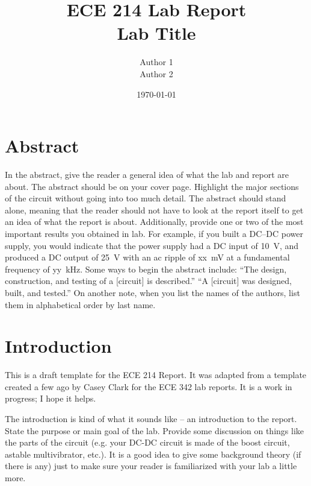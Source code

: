 \documentclass[11pt]{article}
\begin{document}
\title{ \textbf{ECE 214 Lab Report}\\
	Lab Title}
\author{Author 1\\
  	Author 2}
\date{\today}
\maketitle
\thispagestyle{empty}

\section*{Abstract}
\noindent In the abstract, give the reader a general idea of what the lab and report are about. The abstract should be on your cover page. Highlight the major sections of the circuit without going into too much detail. The abstract should stand alone, meaning that the reader should not have to look at the report itself to get an idea of what the report is about. Additionally, provide one or two of the most important results you obtained in lab. For example, if you built a DC--DC power supply, you would indicate that the power supply had a DC input of 10~V, and produced a DC output of 25~V with an ac ripple of xx~mV at a fundamental frequency of yy~kHz. Some ways to begin the abstract include:
``The design, construction, and testing of a [circuit] is described.''
``A [circuit] was designed, built, and tested.''
On another note, when you list the names of the authors, list them in alphabetical order by last name.


\newpage
\tableofcontents

\newpage
\listoffigures

\newpage
\listoftables

\newpage 
{} %

\section{Introduction}
This is a draft template for the ECE 214 Report. It was adapted from a template created a few ago by Casey Clark for the ECE 342 lab reports. It is a work in progress; I hope it helps.

The introduction is kind of what it sounds like – an introduction to the report. State the purpose or main goal of the lab. Provide some discussion on things like the parts of the circuit (e.g. your DC-DC circuit is made of the boost circuit, astable multivibrator, etc.). It is a good idea to give some background theory (if there is any) just to make sure your reader is familiarized with your lab a little more.
\end{document}
